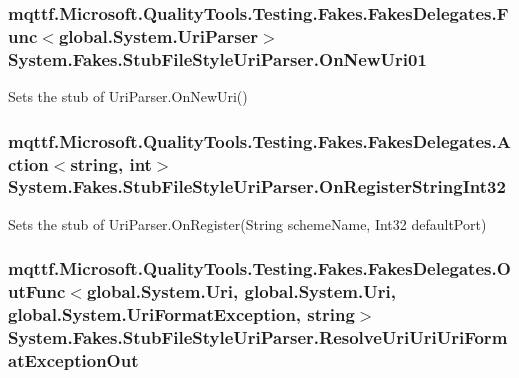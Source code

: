 \hypertarget{class_system_1_1_fakes_1_1_stub_file_style_uri_parser_a3ef9282014ae74007b55797b25845133}{
\subsubsection[{On\-New\-Uri01}]{\setlength{\rightskip}{0pt plus 5cm}mqttf.\-Microsoft.\-Quality\-Tools.\-Testing.\-Fakes.\-Fakes\-Delegates.\-Func$<$global.\-System.\-Uri\-Parser$>$ System.\-Fakes.\-Stub\-File\-Style\-Uri\-Parser.\-On\-New\-Uri01}}\label{class_system_1_1_fakes_1_1_stub_file_style_uri_parser_a3ef9282014ae74007b55797b25845133}


Sets the stub of Uri\-Parser.\-On\-New\-Uri()

\hypertarget{class_system_1_1_fakes_1_1_stub_file_style_uri_parser_a84ffc94e0d68d5053867a528142ccd2a}{
\subsubsection[{On\-Register\-String\-Int32}]{\setlength{\rightskip}{0pt plus 5cm}mqttf.\-Microsoft.\-Quality\-Tools.\-Testing.\-Fakes.\-Fakes\-Delegates.\-Action$<$string, int$>$ System.\-Fakes.\-Stub\-File\-Style\-Uri\-Parser.\-On\-Register\-String\-Int32}}\label{class_system_1_1_fakes_1_1_stub_file_style_uri_parser_a84ffc94e0d68d5053867a528142ccd2a}


Sets the stub of Uri\-Parser.\-On\-Register(\-String scheme\-Name, Int32 default\-Port)

\hypertarget{class_system_1_1_fakes_1_1_stub_file_style_uri_parser_a32427383cad37a09c4d57a458cdbade6}{
\subsubsection[{Resolve\-Uri\-Uri\-Uri\-Format\-Exception\-Out}]{\setlength{\rightskip}{0pt plus 5cm}mqttf.\-Microsoft.\-Quality\-Tools.\-Testing.\-Fakes.\-Fakes\-Delegates.\-Out\-Func$<$global.\-System.\-Uri, global.\-System.\-Uri, global.\-System.\-Uri\-Format\-Exception, string$>$ System.\-Fakes.\-Stub\-File\-Style\-Uri\-Parser.\-Resolve\-Uri\-Uri\-Uri\-Format\-Exception\-Out}}\label{class_system_1_1_fakes_1_1_stub_file_style_uri_parser_a32427383cad37a09c4d57a458cdbade6}


